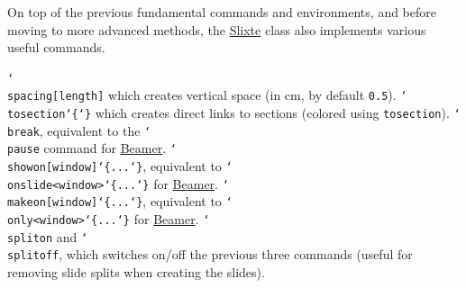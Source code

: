 \documentclass{slixte}
\def\clsurl{https://ctan.org/pkg/slixte}
\newcommand{\codetext}[1]{\texttt{\color{second}#1}}
\newcommand{\cmdt}[1]{\char`\\#1}
\newcommand{\cbrl}{\char`\{}
\newcommand{\cbrr}{\char`\}}
\newcommand{\cbrt}[1]{\cbrl#1\cbrr}
\newcommand{\codeline}[2][0]{\spacing[0.1]\hspace{-1.2cm}\codetext{\foreach\i in {0,...,#1}{~~~~}#2}\par}
\newcommand{\slixte}{\href{\clsurl}{\color{first}Slixte}}
\newcommand{\beamer}{\href{https://ctan.org/pkg/beamer}{\color{first}Beamer}}
\begin{document}
\hypertarget{basic:final}{}
\begin{slide}
    On top of the previous fundamental commands and environments, and before moving to more advanced methods, the \slixte{} class also implements various useful commands.
    \begin{itemize}
        \fillitem \codetext{\cmdt{spacing}[length]} which creates vertical space (in cm, by default \codetext{0.5}).
        \fillitem \codetext{\cmdt{tosection}\cbrt{}} which creates direct links to sections (colored using \codetext{tosection}).
        \fillitem \codetext{\cmdt{break}}, equivalent to the \codetext{\cmdt{pause}} command for \beamer{}.
        \fillitem \codetext{\cmdt{showon}[window]\cbrt{...}}, equivalent to \codetext{\cmdt{onslide}<window>\cbrt{...}} for \beamer{}.
        \fillitem \codetext{\cmdt{makeon}[window]\cbrt{...}}, equivalent to \codetext{\cmdt{only}<window>\cbrt{...}} for \beamer{}.
        \fillitem \codetext{\cmdt{spliton}} and \codetext{\cmdt{splitoff}}, which switches on/off the previous three commands (useful for removing slide splits when creating the slides).
    \end{itemize}
\end{slide}

\iftoggle{examples}{
\begin{slide}[Final useful commands (example)]
    Try putting the following code within a \codetext{slide} in various sections.

    \spacing

    \codeline{You can directly go to \cmdt{tosection}\cbrt{1}{} or \cmdt{tosection}\cbrt{2}.}
    \codeline{}
    \codeline{\cmdt{spacing}}
    \codeline{}
    \codeline{You can also try to go to \cmdt{tosection}\cbrt{0}{} or \cmdt{tosection}\cbrt{10}.}
    \codeline{}
    \codeline{\cmdt{spacing}[2]}
    \codeline{}
    \codeline{Finally, we can also go to \cmdt{tosection}\cbrt{}.}
\end{slide}

\begin{slide}[Final useful commands (example)]
    Try putting the following code within a \codetext{slide} environment.

    \spacing

    \codeline{A text on every slide.}
    \codeline{\cmdt{break}}
    \codeline{Some text appearing on the second slide.}
    \codeline{}
    \codeline{\cmdt{showon}[3]\cbrt{A line only shown on the third slide.}}
    \codeline{}
    \codeline{\cmdt{makeon}[4]\cbrt{A line only made on the fourth slide.}}
    \codeline{}
    \codeline{A final line differentiating show and make.}
\end{slide}
}{}
\end{document}
